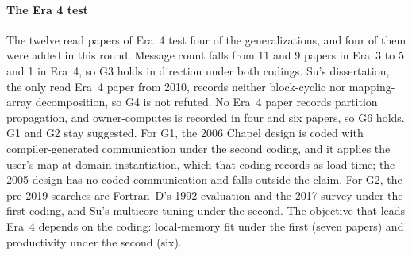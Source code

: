 \paragraph{The Era 4 test}
The twelve read papers of Era~4 test four of the generalizations, and four of them were added in this round. Message count falls from 11 and 9 papers in Era~3 to 5 and 1 in Era~4, so G3 holds in direction under both codings. Su's dissertation, the only read Era~4 paper from 2010, records neither block-cyclic nor mapping-array decomposition, so G4 is not refuted. No Era~4 paper records partition propagation, and owner-computes is recorded in four and six papers, so G6 holds. G1 and G2 stay suggested. For G1, the 2006 Chapel design is coded with compiler-generated communication under the second coding, and it applies the user's map at domain instantiation, which that coding records as load time; the 2005 design has no coded communication and falls outside the claim. For G2, the pre-2019 searches are Fortran~D's 1992 evaluation and the 2017 survey under the first coding, and Su's multicore tuning under the second.  The objective that leads Era~4 depends on the coding: local-memory fit under the first (seven papers) and productivity under the second (six).
